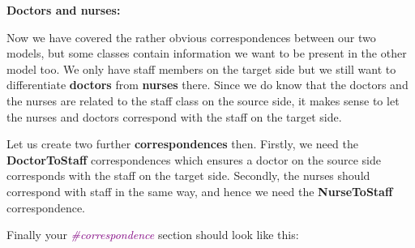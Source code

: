 \clearpage

\textbf{Doctors and nurses:}

Now we have covered the rather obvious correspondences between our two models, but some classes contain information we want to be present in the other model too. We only have staff members on the target side but we still want to differentiate \textbf{doctors} from \textbf{nurses} there. Since we do know that the doctors and the nurses are related to the staff class on the source side, it makes sense to let the nurses and doctors correspond with the staff on the target side.

Let us create two further \textbf{correspondences} then. Firstly, we need the \textbf{DoctorToStaff} correspondences which ensures a doctor on the source side corresponds with the staff on the target side. Secondly, the nurses should correspond with staff in the same way, and hence we need the \textbf{NurseToStaff} correspondence.\newline

Finally your \textcolor{Purple}{\textit{\#correspondence}} section should look like this:\newline

